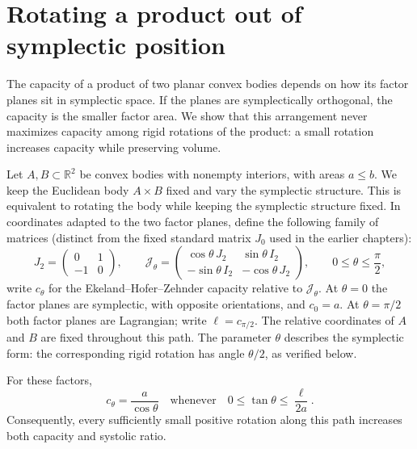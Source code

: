 \section{Rotating a product out of symplectic position}
\label{sec:product-rotation}

The capacity of a product of two planar convex bodies depends on how its
factor planes sit in symplectic space. If the planes are symplectically
orthogonal, the capacity is the smaller factor area. We show that this
arrangement never maximizes capacity among rigid rotations of the product:
a small rotation increases capacity while preserving volume.

Let $A,B\subset\mathbb R^2$ be convex bodies with nonempty interiors, with
areas $a\le b$. We keep the Euclidean body $A\times B$ fixed and vary the
symplectic structure. This is equivalent to rotating the body while keeping
the symplectic structure fixed. In coordinates adapted to the two factor
planes, define the following family of matrices (distinct from the fixed
standard matrix $J_0$ used in the earlier chapters):
\[
 J_2=\begin{pmatrix}0&1\\-1&0\end{pmatrix},\qquad
 \mathcal J_\theta=
 \begin{pmatrix}
  \cos\theta\,J_2&\sin\theta\,I_2\\
  -\sin\theta\,I_2&-\cos\theta\,J_2
 \end{pmatrix},
 \qquad 0\le\theta\le\frac\pi2,
\]
write $c_\theta$ for the Ekeland--Hofer--Zehnder capacity relative to
$\mathcal J_\theta$. At $\theta=0$ the factor planes are symplectic, with opposite
orientations, and $c_0=a$. At $\theta=\pi/2$ both factor planes are Lagrangian;
write $\ell=c_{\pi/2}$. The relative coordinates of $A$ and $B$ are fixed
throughout this path. The parameter $\theta$ describes the symplectic form:
the corresponding rigid rotation has angle $\theta/2$, as verified below.

\begin{theorem}\label{thm:product-initial-rotation}
For these factors,
\[
 c_\theta=\frac{a}{\cos\theta}
 \quad\text{whenever}\quad
 0\le\tan\theta\le\frac{\ell}{2a}.
\]
Consequently, every sufficiently small positive rotation along this path
increases both capacity and systolic ratio.
\end{theorem}

